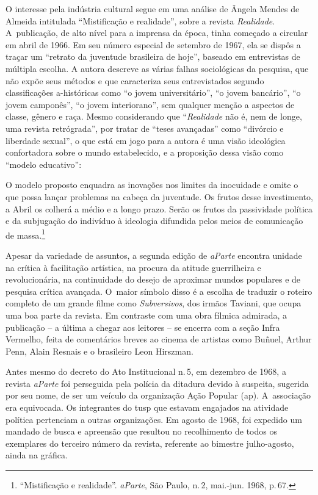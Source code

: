 {O interesse pela indústria cultural segue em uma análise de Ângela Mendes
de Almeida intitulada “Mistificação e realidade”, sobre a revista
{\it Realidade}. A~publicação, de alto nível para a imprensa da época,
tinha começado a circular em abril de 1966. Em seu número especial de
setembro de 1967, ela se dispôs a traçar um “retrato da juventude
brasileira de hoje”, baseado em entrevistas de múltipla escolha. A
autora descreve as várias falhas sociológicas da pesquisa, que não expõe
seus métodos e que caracteriza seus entrevistados segundo classificações
a-históricas como “o jovem universitário”, “o jovem bancário”, “o jovem
camponês”, “o jovem interiorano”, sem qualquer menção a aspectos de
classe, gênero e raça. Mesmo considerando que “{\it Realidade} não é, nem
de longe, uma revista retrógrada”, por tratar de “teses avançadas” como
“divórcio e liberdade sexual”, o que está em jogo para a autora é uma
visão ideológica confortadora sobre o mundo estabelecido, e a proposição
dessa visão como “modelo educativo”:

\startblockquote
O modelo proposto enquadra as inovações nos limites da inocuidade e
omite o que possa lançar problemas na cabeça da juventude. Os frutos
desse investimento, a Abril os colherá a médio e a longo prazo. Serão os
frutos da passividade política e da subjugação do indivíduo à ideologia
difundida pelos meios de comunicação de massa.\footnote{“Mistificação e
  realidade”. {\it aParte}, São Paulo, n.\,2, mai.-jun. 1968, p.\,67.}
\stopblockquote

Apesar da variedade de assuntos, a segunda edição de {\it aParte}
encontra unidade na crítica à facilitação artística, na procura da
atitude guerrilheira e revolucionária, na continuidade do desejo de
aproximar mundos populares e de pesquisa crítica avançada. O~maior
símbolo disso é a escolha de traduzir o roteiro completo de um grande
filme como {\it Subversivos}, dos irmãos Taviani, que ocupa uma boa
parte da revista. Em contraste com uma obra fílmica admirada, a
publicação -- a última a chegar aos leitores -- se encerra com
a seção Infra Vermelho, feita de comentários breves ao cinema
de artistas como Buñuel, Arthur Penn, Alain Resnais e o
brasileiro Leon Hirszman.


Antes mesmo do decreto do Ato Institucional n.\,5, em dezembro de
1968, a revista {\it aParte} foi perseguida pela polícia da ditadura
devido à suspeita, sugerida por seu nome, de ser um veículo da
organização Ação Popular ({\sc ap}). A~associação era equivocada. Os
integrantes do {\sc tusp} que estavam engajados na atividade política
pertenciam a outras organizações. Em agosto de 1968, foi expedido um
mandado de busca e apreensão que resultou no recolhimento de todos os
exemplares do terceiro número da revista, referente ao bimestre
julho-agosto, ainda na gráfica.

}
